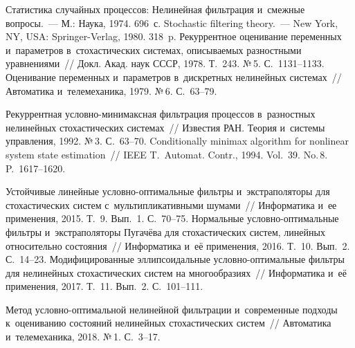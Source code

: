 \begin{multicols}{2}
{{\begin{thebibliography}{99}
 Статистика случайных процессов: Нелинейная 
фильтрация и~смежные вопросы.~--- М.: Наука, 1974. 696~с.
 Stochastic filtering theory.~--- New York, NY, USA: Springer-Verlag, 1980. 
318~p.
 Рекуррентное оценивание переменных и~параметров в~стохастических 
системах, опи\-сы\-ва\-емых разностными уравнениями~// Докл. Акад. наук СССР, 1978. Т.~243. №\,5.  
С.~1131--1133.
 Оценивание переменных и~параметров в~дискретных нелинейных 
системах~// Автоматика и~телемеханика, 1979. №\,6. С.~63--79.


 Рекуррентная услов\-но-ми\-ни\-макс\-ная фильтрация процессов 
в~разностных нелинейных стохастических системах~// Известия РАН. Теория и~системы 
управления, 1992. №\,3. С.~63--70.
 Conditionally minimax algorithm for nonlinear system state 
estimation~// IEEE T.~Automat. Contr., 1994. Vol.~39. No.\,8. P.~1617--1620.
{

}

 Устойчивые линейные условно-оптимальные 
фильтры и~экстраполяторы для стохастических систем с~мультипликативными шумами~// 
Информатика и~ее применения, 2015. Т.~9. Вып.~1. С.~70--75. 
 Нормальные услов\-но-оп\-ти\-маль\-ные фильтры 
и~экстраполяторы Пугачёва для стохастических систем, линейных относительно 
состояния~// Информатика и~её применения, 2016. Т.~10. Вып.~2. С.~14--23. 
 Модифицированные 
эллипсоидальные услов\-но-оп\-ти\-маль\-ные фильтры для нелинейных стохастических 
систем на многообразиях~// Информатика и~её применения, 2017. Т.~11. Вып.~2.  
С.~101--111.

 Метод 
условно-оптимальной нелинейной фильтрации и~современные подходы к~оцениванию 
состояний нелинейных стохастических\linebreak
 систем~// Автоматика и~телемеханика, 2018. №\,1. 
С.~3--17. 
 \end{thebibliography}

 }
 }

\end{multicols}


